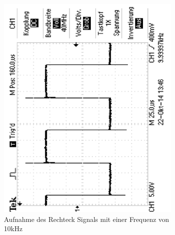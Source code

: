 \documentclass[12pt,a4paper]{article}
\begin{document}
\begin{figure}[H]
\begin{subfigure}[b]{0.28\textwidth}
                \includegraphics[width=\textwidth , scale = 0.4, angle = -90]{2_1_rech_10khz.pdf}
                \caption[Aufnahme des Rechtecksignals mit einer Frequenz von 10kHz]{Aufnahme des Rechteck Signals mit einer Frequenz von 10kHz}
                \label{fig:2_1_rech_10khz}
        \end{subfigure}
        ~ %
        \hfill
        \begin{subfigure}[b]{0.28\textwidth}

\end{subfigure}
\end{figure}
\end{document}
